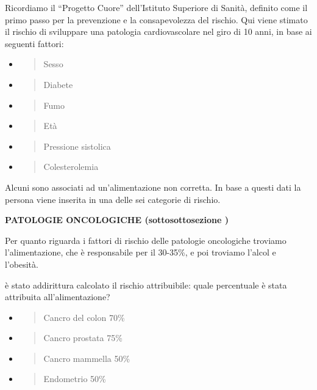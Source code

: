 \documentclass[]{article}
\begin{document}
Ricordiamo il ``Progetto Cuore'' dell'Istituto Superiore di Sanità,
definito come il primo passo per la prevenzione e la consapevolezza del
rischio. Qui viene stimato il rischio di sviluppare una patologia
cardiovascolare nel giro di 10 anni, in base ai seguenti fattori:

\begin{itemize}
\item
  \begin{quote}
  Sesso
  \end{quote}
\item
  \begin{quote}
  Diabete
  \end{quote}
\item
  \begin{quote}
  Fumo
  \end{quote}
\item
  \begin{quote}
  Età
  \end{quote}
\item
  \begin{quote}
  Pressione sistolica
  \end{quote}
\item
  \begin{quote}
  Colesterolemia
  \end{quote}
\end{itemize}

Alcuni sono associati ad un'alimentazione non corretta. In base a questi
dati la persona viene inserita in una delle sei categorie di rischio.

\textbf{PATOLOGIE ONCOLOGICHE (sottosottosezione )}

Per quanto riguarda i fattori di rischio delle patologie oncologiche
troviamo l'alimentazione, che è responsabile per il 30-35\%, e poi
troviamo l'alcol e l'obesità.

è stato addirittura calcolato il rischio attribuibile: quale percentuale
è stata attribuita all'alimentazione?

\begin{itemize}
\item
  \begin{quote}
  Cancro del colon 70\%
  \end{quote}
\item
  \begin{quote}
  Cancro prostata 75\%
  \end{quote}
\item
  \begin{quote}
  Cancro mammella 50\%
  \end{quote}
\item
  \begin{quote}
  Endometrio 50\%
  \end{quote}
\end{itemize}
\end{document}
